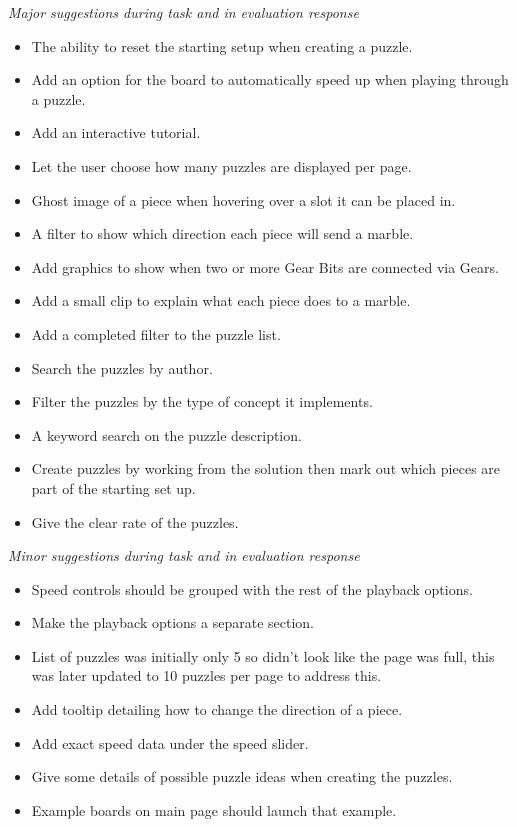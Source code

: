 \documentclass{l4proj}
\begin{document}
\emph{Major suggestions during task and in evaluation response}
\label{suggestions}
\begin{itemize}
    \item The ability to reset the starting setup when creating a puzzle.
    \item Add an option for the board to automatically speed up when playing through a puzzle.
    \item Add an interactive tutorial.
    \item Let the user choose how many puzzles are displayed per page.
    \item Ghost image of a piece when hovering over a slot it can be placed in.
    \item A filter to show which direction each piece will send a marble.
    \item Add graphics to show when two or more Gear Bits are connected via Gears.
    \item Add a small clip to explain what each piece does to a marble.
    \item Add a completed filter to the puzzle list.
    \item Search the puzzles by author.
    \item Filter the puzzles by the type of concept it implements.
    \item A keyword search on the puzzle description.
    \item Create puzzles by working from the solution then mark out which pieces are part of the starting set up.
    \item Give the clear rate of the puzzles.
\end{itemize}

\emph{Minor suggestions during task and in evaluation response}
\begin{itemize}
    \item Speed controls should be grouped with the rest of the playback options.
    \item Make the playback options a separate section.
    \item List of puzzles was initially only 5 so didn't look like the page was full, this was later updated to 10 puzzles per page to address this.
    \item Add tooltip detailing how to change the direction of a piece.
    \item Add exact speed data under the speed slider.
    \item Give some details of possible puzzle ideas when creating the puzzles.
    \item Example boards on main page should launch that example.
\end{itemize}
\end{document}
